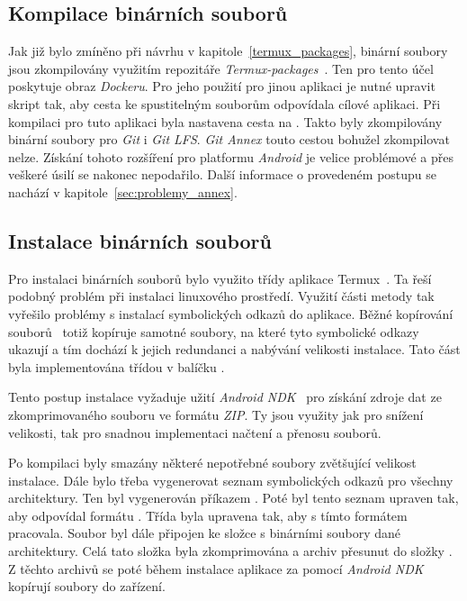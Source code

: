     \subsection{Kompilace binárních souborů}
    Jak již bylo zmíněno při návrhu v kapitole~\ref{termux_packages}, binární soubory jsou zkompilovány využitím repozitáře \emph{Termux-packages}~. Ten pro tento účel poskytuje obraz \emph{Dockeru}. Pro jeho použití pro jinou aplikaci je nutné upravit skript  tak, aby cesta ke spustitelným souborům odpovídala cílové aplikaci. Při kompilaci pro tuto aplikaci byla nastavena cesta  na . Takto byly zkompilovány binární soubory pro \emph{Git} i \emph{Git LFS}. \emph{Git Annex} touto cestou bohužel zkompilovat nelze. Získání tohoto rozšíření pro platformu \emph{Android} je velice problémové a přes veškeré úsilí se nakonec nepodařilo. Další informace o provedeném postupu se nachází v kapitole~\ref{sec:problemy_annex}.

    \subsection{Instalace binárních souborů}
    Pro instalaci binárních souborů bylo využito třídy  aplikace Termux~. Ta řeší podobný problém při instalaci linuxového prostředí. Využití části metody  tak vyřešilo problémy s instalací symbolických odkazů do aplikace. Běžné kopírování souborů~ totiž kopíruje samotné soubory, na které tyto symbolické odkazy ukazují a tím dochází k jejich redundanci a nabývání velikosti instalace. Tato část byla implementována třídou  v balíčku .

    Tento postup instalace vyžaduje užití \emph{Android NDK}~ pro získání zdroje dat ze zkomprimovaného souboru ve formátu \emph{ZIP}. Ty jsou využity jak pro snížení velikosti, tak pro snadnou implementaci načtení a přenosu souborů.

    Po kompilaci byly smazány některé nepotřebné soubory zvětšující velikost instalace. Dále bylo třeba vygenerovat seznam symbolických odkazů pro všechny architektury. Ten byl vygenerován příkazem . Poté byl tento seznam upraven tak, aby odpovídal formátu . Třída  byla upravena tak, aby s tímto formátem pracovala. Soubor  byl dále připojen ke složce s binárními soubory dané architektury. Celá tato složka byla zkomprimována a archiv přesunut do složky . Z těchto archivů se poté během instalace aplikace za pomocí \emph{Android NDK} kopírují soubory do zařízení.

